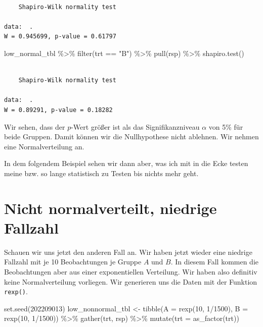 \documentclass[
  letterpaper,
]{scrbook}
\newenvironment{Shaded}{\begin{snugshade}}{\end{snugshade}}
\newcommand{\AttributeTok}[1]{\textcolor[rgb]{0.40,0.45,0.13}{#1}}
\newcommand{\DecValTok}[1]{\textcolor[rgb]{0.68,0.00,0.00}{#1}}
\newcommand{\FunctionTok}[1]{\textcolor[rgb]{0.28,0.35,0.67}{#1}}
\newcommand{\NormalTok}[1]{\textcolor[rgb]{0.00,0.23,0.31}{#1}}
\newcommand{\OtherTok}[1]{\textcolor[rgb]{0.00,0.23,0.31}{#1}}
\newcommand{\SpecialCharTok}[1]{\textcolor[rgb]{0.37,0.37,0.37}{#1}}
\newcommand{\StringTok}[1]{\textcolor[rgb]{0.13,0.47,0.30}{#1}}
\begin{document}
\begin{verbatim}

    Shapiro-Wilk normality test

data:  .
W = 0.945699, p-value = 0.61797
\end{verbatim}

\begin{Shaded}
\begin{Highlighting}[]
\NormalTok{low\_normal\_tbl }\SpecialCharTok{\%\textgreater{}\%} 
  \FunctionTok{filter}\NormalTok{(trt }\SpecialCharTok{==} \StringTok{"B"}\NormalTok{) }\SpecialCharTok{\%\textgreater{}\%} 
  \FunctionTok{pull}\NormalTok{(rsp) }\SpecialCharTok{\%\textgreater{}\%} 
  \FunctionTok{shapiro.test}\NormalTok{()}
\end{Highlighting}
\end{Shaded}

\begin{verbatim}

    Shapiro-Wilk normality test

data:  .
W = 0.89291, p-value = 0.18282
\end{verbatim}

Wir sehen, dass der \(p\)-Wert größer ist als das Signifikanzniveau
\(\alpha\) von 5\% für beide Gruppen. Damit können wir die Nullhypothese
nicht ablehnen. Wir nehmen eine Normalverteilung an.

In dem folgendem Beispiel sehen wir dann aber, was ich mit in die Ecke
testen meine bzw. so lange statistisch zu Testen bis nichts mehr geht.

\hypertarget{nicht-normalverteilt-niedrige-fallzahl}{%
\section{Nicht normalverteilt, niedrige
Fallzahl}\label{nicht-normalverteilt-niedrige-fallzahl}}

Schauen wir uns jetzt den anderen Fall an. Wir haben jetzt wieder eine
niedrige Fallzahl mit je 10 Beobachtungen je Gruppe \(A\) und \(B\). In
diesem Fall kommen die Beobachtungen aber aus einer exponentiellen
Verteilung. Wir haben also definitiv keine Normalverteilung vorliegen.
Wir generieren uns die Daten mit der Funktion \texttt{rexp()}.

\begin{Shaded}
\begin{Highlighting}[]
\FunctionTok{set.seed}\NormalTok{(}\DecValTok{202209013}\NormalTok{)}
\NormalTok{low\_nonnormal\_tbl }\OtherTok{\textless{}{-}} \FunctionTok{tibble}\NormalTok{(}\AttributeTok{A =} \FunctionTok{rexp}\NormalTok{(}\DecValTok{10}\NormalTok{, }\DecValTok{1}\SpecialCharTok{/}\DecValTok{1500}\NormalTok{),}
                            \AttributeTok{B =} \FunctionTok{rexp}\NormalTok{(}\DecValTok{10}\NormalTok{, }\DecValTok{1}\SpecialCharTok{/}\DecValTok{1500}\NormalTok{)) }\SpecialCharTok{\%\textgreater{}\%} 
  \FunctionTok{gather}\NormalTok{(trt, rsp) }\SpecialCharTok{\%\textgreater{}\%} 
  \FunctionTok{mutate}\NormalTok{(}\AttributeTok{trt =} \FunctionTok{as\_factor}\NormalTok{(trt))}
\end{Highlighting}
\end{Shaded}
\end{document}

